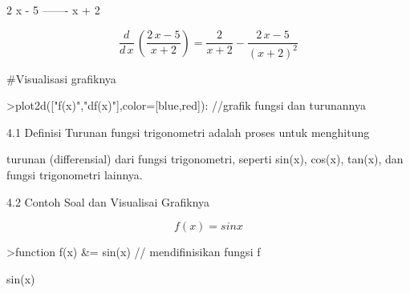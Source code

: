 \documentclass[a4paper,10pt]{article}
\begin{document}
\begin{eulernotebook}
\begin{eulercomment}
\begin{eulercomment}
\begin{eulercomment}
\begin{eulercomment}
\begin{eulercomment}
\begin{eulercomment}
\begin{eulercomment}
\begin{eulercomment}
\begin{eulercomment}
\begin{eulercomment}
\begin{eulercomment}
\begin{eulercomment}
\begin{eulercomment}
\begin{eulercomment}
\begin{eulercomment}
\begin{eulercomment}
\begin{euleroutput}
                                 2 x - 5
                                 -------
                                  x + 2
  
\end{euleroutput}
\begin{eulerformula}
\[
\frac{d}{d\,x}\,\left(\frac{2\,x-5}{x+2}\right)=\frac{2}{x+2}-  \frac{2\,x-5}{\left(x+2\right)^2}
\]
\end{eulerformula}
\begin{eulercomment}
#Visualisasi grafiknya
\end{eulercomment}
\begin{eulerprompt}
>plot2d(["f(x)","df(x)"],color=[blue,red]): //grafik fungsi dan turunannya
\end{eulerprompt}
\begin{eulercomment}
\end{eulercomment}
\begin{eulerttcomment}
    4.1 Definisi
        Turunan fungsi trigonometri adalah proses untuk menghitung
\end{eulerttcomment}
\begin{eulercomment}
turunan (differensial) dari fungsi trigonometri, seperti sin(x),
cos(x), tan(x), dan fungsi trigonometri lainnya.

\end{eulercomment}
\begin{eulerttcomment}
    4.2 Contoh Soal dan Visualisai Grafiknya
\end{eulerttcomment}
\begin{eulercomment}

\end{eulercomment}
\begin{eulerformula}
\[
f(x) = sin x
\]
\end{eulerformula}
\begin{eulerprompt}
>function f(x) &= sin(x) // mendifinisikan fungsi f
\end{eulerprompt}
\begin{euleroutput}
  
                                  sin(x)
  

\end{euleroutput}
\end{eulercomment}
\end{eulercomment}
\end{eulercomment}
\end{eulercomment}
\end{eulercomment}
\end{eulercomment}
\end{eulercomment}
\end{eulercomment}
\end{eulercomment}
\end{eulercomment}
\end{eulercomment}
\end{eulercomment}
\end{eulercomment}
\end{eulercomment}
\end{eulercomment}
\end{eulercomment}
\end{eulernotebook}
\end{document}
